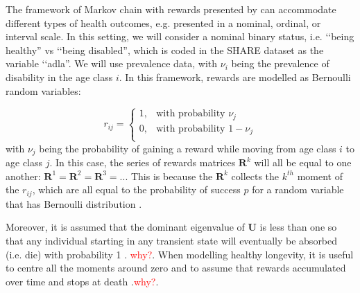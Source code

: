 \documentclass[\main/main.tex]{subfiles}
\begin{document}
The framework of Markov chain with rewards presented by \cite{Caswell2018} can accommodate different types of health outcomes, e.g. presented in a nominal, ordinal, or interval scale. In this setting, we will consider a nominal binary status, i.e. \lq\lq being healthy'' vs \lq\lq being disabled'', which is coded in the SHARE dataset as the variable \lq\lq adla''.
We will use prevalence data, with $\nu_i$ being the prevalence of disability in the age class $i$. In this framework, rewards are modelled as Bernoulli random variables:

\begin{equation}
  r_{ij} = \begin{cases}
        1, & \text{with probability } \nu_j\\
        0, & \text{with probability } 1-\nu_j\\
        \end{cases}
\end{equation}
with $\nu_j$ being the probability of gaining a reward while moving from age class $i$ to age class $j$. In this case, the series of rewards matrices $\mathbf{R}^k$ will all be equal to one another: $\mathbf{R}^1= \mathbf{R}^2 =\mathbf{R}^3 = ..$. This is because the $\mathbf{R}^k$ collects the $k^{th}$ moment of the $r_{ij}$, which are all equal to the probability of success $p$  for a random variable that has Bernoulli distribution \citep{forbes2011}. 



Moreover, it is assumed that the dominant eigenvalue of $\mathbf{U}$ is less than one so that any individual starting in any transient state will eventually be absorbed (i.e. die) with probability 1 \citep{Caswell2011}.
\textcolor{red}{why?}.
When modelling healthy longevity, it is useful to centre all the moments around zero and to assume that rewards accumulated over time and stops at death \citep{Caswell2018}.\textcolor{red}{why?}.\\
\end{document}
